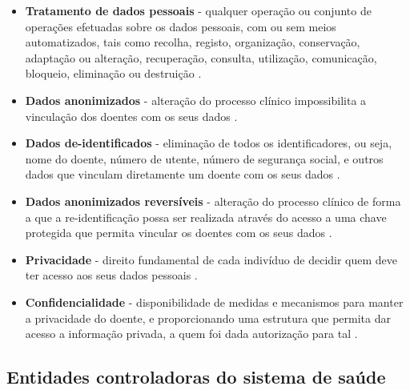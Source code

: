 \documentclass[conference]{IEEEtran}
\begin{document}
\begin{itemize}
	\item \textbf{Tratamento de dados pessoais} - qualquer operação ou conjunto de operações efetuadas sobre os dados pessoais, com ou sem meios automatizados, tais como recolha, registo, organização, conservação, adaptação ou alteração, recuperação, consulta, utilização, comunicação, bloqueio, eliminação ou destruição \cite{parecerERS2015}.
	
	\item \textbf{Dados anonimizados} - alteração do processo clínico impossibilita a vinculação dos doentes com os seus dados \cite{safran2007toward}.
	
	\item \textbf{Dados de-identificados} - eliminação de todos os identificadores, ou seja, nome do doente, número de utente, número de segurança social, e outros dados que vinculam diretamente um doente com os seus dados \cite{safran2007toward}.
	
	\item \textbf{Dados anonimizados reversíveis} - alteração do processo clínico de forma a que a re-identificação possa ser realizada através do acesso a uma chave protegida que permita vincular os doentes com os seus dados \cite{safran2007toward}.
	
	\item \textbf{Privacidade} - direito fundamental de cada indivíduo de decidir quem deve ter acesso aos seus dados pessoais \cite{segurancaSI}.
	
	\item \textbf{Confidencialidade} - disponibilidade de medidas e mecanismos para manter a privacidade do doente, e proporcionando uma estrutura que permita dar acesso a informação privada, a quem foi dada autorização para tal \cite{segurancaSI}.
	
\end{itemize}

\subsection{Entidades controladoras do sistema de saúde}
\end{document}
